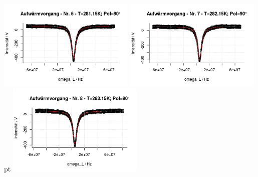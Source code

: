 \documentclass[12pt]{article}
\begin{document}
\begin{minipage}[h!]{\textwidth}
	\includegraphics[width=0.49\textwidth]{figures/warm90-6.png}\vskip -10pt
	\includegraphics[width=0.49\textwidth]{figures/warm90-7.png} pt
	\includegraphics[width=0.49\textwidth]{figures/warm90-8.png}\vskip -10pt
\end{minipage}\newpage
\end{document}
